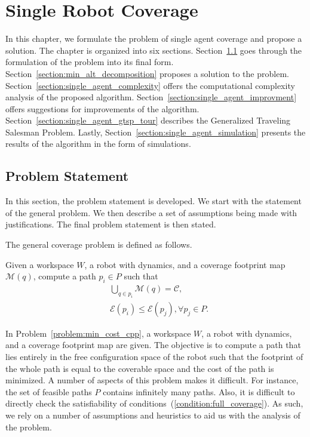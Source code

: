 \documentclass[../main.tex]{subfiles}
\begin{document}
\chapter{Single Robot Coverage}
\label{chapter:single_robot_coverage}

In this chapter, we formulate the problem of single agent coverage and propose a solution. The chapter is organized into six sections. Section~\ref{section:single_problem_statement} goes through the formulation of the problem into its final form. Section~\ref{section:min_alt_decomposition} proposes a solution to the problem. Section~\ref{section:single_agent_complexity} offers the computational complexity analysis of the proposed algorithm. Section~\ref{section:single_agent_improvment} offers suggestions for improvements of the algorithm. Section~\ref{section:single_agent_gtsp_tour} describes the Generalized Traveling Salesman Problem. Lastly, Section~\ref{section:single_agent_simulation} presents the results of the algorithm in the form of simulations.

\section{Problem Statement}
\label{section:single_problem_statement}

In this section, the problem statement is developed. We start with the statement of the general problem. We then describe a set of assumptions being made with justifications. The final problem statement is then stated.

The general coverage problem is defined as follows.
\begin{problem}
\label{problem:min_cost_cpp}
	Given a workspace $W$, a robot with dynamics, and a coverage footprint map $\mathcal{M}(q)$, compute a path $p_i\in P$ such that
	\begin{equation}
	\label{condition:full_coverage}
	\begin{aligned}
		& \bigcup_{q\in p_i}\mathcal{M}(q)=\mathcal{C},\\
		& \mathcal{E}(p_i)\leq\mathcal{E}(p_j), \forall p_j\in P.
	\end{aligned}
	\end{equation}
\end{problem}

In Problem~\ref{problem:min_cost_cpp}, a workspace $W$, a robot with dynamics, and a coverage footprint map are given. The objective is to compute a path that lies entirely in the free configuration space of the robot such that the footprint of the whole path is equal to the coverable space and the cost of the path is minimized. A number of aspects of this problem makes it difficult. For instance, the set of feasible paths $P$ contains infinitely many paths. Also, it is difficult to directly check the satisfiability of conditions~(\ref{condition:full_coverage}). As such, we rely on a number of assumptions and heuristics to aid us with the analysis of the problem.
\end{document}
